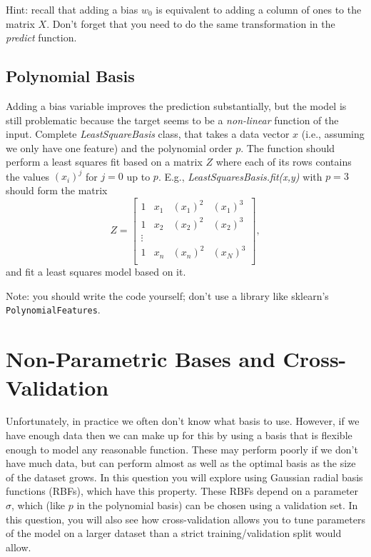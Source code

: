 \documentclass{article}
\begin{document}
Hint: recall that adding a bias $w_0$ is equivalent to adding a column of ones to the matrix $X$. Don't forget that you need to do the same transformation in the \emph{predict} function.


\subsection{Polynomial Basis}

Adding a bias variable improves the prediction substantially, but the model is still problematic because the target seems to be a \emph{non-linear} function of the input. Complete \emph{LeastSquareBasis} class, that takes a data vector $x$ (i.e., assuming we only have one feature) and the polynomial order $p$. The function should perform a least squares fit based on a matrix $Z$ where each of its rows contains the values $(x_{i})^j$ for $j=0$ up to $p$. E.g., \emph{LeastSquaresBasis.fit(x,y)}  with $p = 3$ should form the matrix
\[
Z = 
\left[\begin{array}{cccc}
1 & x_1 & (x_1)^2 & (x_1)^3\\
1 & x_2 & (x_2)^2 & (x_2)^3\\
\vdots\\
1 & x_n & (x_n)^2 & (x_N)^3\\
\end{array}
\right],
\]
and fit a least squares model based on it.

Note: you should write the code yourself; don't use a library like sklearn's \texttt{PolynomialFeatures}.


\section{Non-Parametric Bases and Cross-Validation}

Unfortunately, in practice we often don't know what basis to use. 
However, if we have enough data then we can make up for this by using a basis that is flexible enough to 
model any reasonable function. These may perform poorly if we don't have much data, but can
 perform almost as well as the optimal basis as the size of the dataset grows. 
 In this question you will explore using Gaussian radial basis functions (RBFs), 
 which have this property. These RBFs depend on a parameter $\sigma$, which 
 (like $p$ in the polynomial basis) can be chosen using a validation set. 
 In this question, you will also see how cross-validation allows you to tune
 parameters of the model on a larger dataset than a strict training/validation split would allow.
\end{document}
